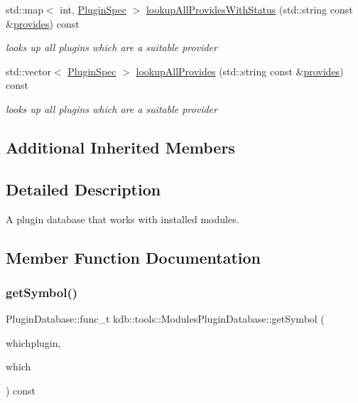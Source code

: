 \begin{DoxyCompactItemize}
std\+::map$<$ int, \mbox{\hyperlink{classkdb_1_1tools_1_1PluginSpec}{Plugin\+Spec}} $>$ \mbox{\hyperlink{classkdb_1_1tools_1_1ModulesPluginDatabase_abe19487ff2a2e0548288dfa2a5678ae1}{lookup\+All\+Provides\+With\+Status}} (std\+::string const \&\mbox{\hyperlink{classkdb_1_1tools_1_1PluginDatabase_afc91ff760616ee83c6afb70e5a2f0601a73ff10d6a07213c277db4326b3df6c4b}{provides}}) const
\begin{DoxyCompactList}\small\item\em looks up all plugins which are a suitable provider \end{DoxyCompactList}\item 
std\+::vector$<$ \mbox{\hyperlink{classkdb_1_1tools_1_1PluginSpec}{Plugin\+Spec}} $>$ \mbox{\hyperlink{classkdb_1_1tools_1_1ModulesPluginDatabase_a306384e88f9cf2874f6ba9ce28973a26}{lookup\+All\+Provides}} (std\+::string const \&\mbox{\hyperlink{classkdb_1_1tools_1_1PluginDatabase_afc91ff760616ee83c6afb70e5a2f0601a73ff10d6a07213c277db4326b3df6c4b}{provides}}) const
\begin{DoxyCompactList}\small\item\em looks up all plugins which are a suitable provider \end{DoxyCompactList}\end{DoxyCompactItemize}
\subsection*{Additional Inherited Members}


\subsection{Detailed Description}
A plugin database that works with installed modules. 

\subsection{Member Function Documentation}
\mbox{\label{classkdb_1_1tools_1_1ModulesPluginDatabase_a0e81e1b7b296a52f8040fd966b461c3a}} 
\subsubsection{\texorpdfstring{getSymbol()}{getSymbol()}}
{\footnotesize\ttfamily Plugin\+Database\+::func\+\_\+t kdb\+::tools\+::\+Modules\+Plugin\+Database\+::get\+Symbol (\begin{DoxyParamCaption}\item[{\mbox{\hyperlink{classkdb_1_1tools_1_1PluginSpec}{Plugin\+Spec}} const \&}]{whichplugin,  }\item[{std\+::string const \&}]{which }\end{DoxyParamCaption}) const\hspace{0.3cm}{\ttfamily [virtual]}}



